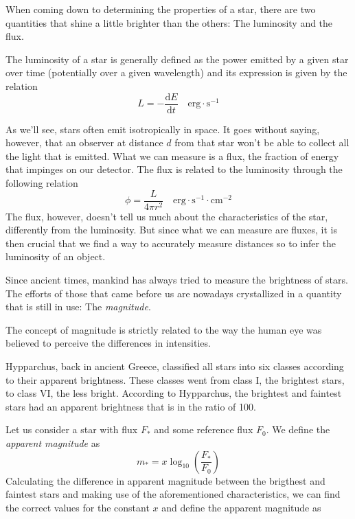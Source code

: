 When coming down to determining the properties of a star, there are two quantities that shine a little brighter than the others: The luminosity and the flux.
\par The luminosity of a star is generally defined as the power emitted by a given star over time (potentially over a given wavelength) and its expression is given by the relation
\begin{equation}
    L = -\frac{\text{d}E}{\text{d}t} \quad \text{erg}\cdot\text{s}^{-1}
    \label{eq:luminosity}
\end{equation}
\par As we'll see, stars often emit isotropically in space. It goes without saying, however, that an observer at distance $d$ from that star won't be able to collect all the light that is emitted. What we can measure is a flux, the fraction of energy that impinges on our detector. The flux is related to the luminosity through the following relation
\begin{equation}
    \phi = \frac{L}{4\pi r^{2}} \quad \text{erg}\cdot\text{s}^{-1}\cdot\text{cm}^{-2}
    \label{eq:flux}
\end{equation}
The flux, however, doesn't tell us much about the characteristics of the star, differently from the luminosity. But since what we can measure are fluxes, it is then crucial that we find a way to accurately measure distances so to infer the luminosity of an object.
\par Since ancient times, mankind has always tried to measure the brightness of stars. The efforts of those that came before us are nowadays crystallized in a quantity that is still in use: The \emph{magnitude}.
\par The concept of magnitude is strictly related to the way the human eye was believed to perceive the differences in intensities.
\par Hypparchus, back in ancient Greece, classified all stars into six classes according to their apparent brightness. These classes went from class I, the brightest stars, to class VI, the less bright. According to Hypparchus, the brightest and faintest stars had an apparent brightness that is in the ratio of 100.
\par Let us consider a star with flux $F_{*}$ and some reference flux $F_{0}$. We define the \emph{apparent magnitude} as 
\begin{equation*}
    m_{*} = x \log_{10}\left(\frac{F_{*}}{F_{0}}\right)
\end{equation*}
Calculating the difference in apparent magnitude between the brigthest and faintest stars and making use of the aforementioned characteristics, we can find the correct values for the constant $x$ and define the apparent magnitude as

